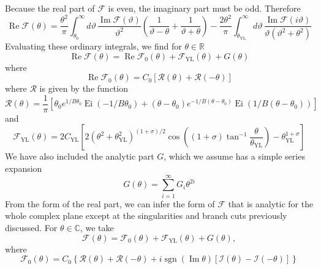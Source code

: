 \documentclass[
aps,
pre,
preprint,
longbibliography,
floatfix
]{revtex4-2}
\begin{document}
Because the real part of $\mathcal F$ is even, the imaginary part must be odd. Therefore
\begin{equation} \label{eq:dispersion}
  \operatorname{Re}\mathcal F(\theta)
  =\frac{\theta^2}{\pi}
  \int_{\theta_0}^\infty d\vartheta\,\frac{\operatorname{Im}\mathcal F(\vartheta)}{\vartheta^2}\left(\frac1{\vartheta-\theta}+\frac1{\vartheta+\theta}\right)
  -\frac{2\theta^2}\pi\int_{\theta_{\mathrm{YL}}}^{\infty}d\vartheta\,\frac{\operatorname{Im}\mathcal F(i\vartheta)}{\vartheta(\vartheta^2+\theta^2)}
\end{equation}
Evaluating these ordinary integrals, we find for $\theta\in\mathbb R$
\begin{equation}
\label{eq:FfromFoFYLG}
  \operatorname{Re}\mathcal F(\theta)=\operatorname{Re}\mathcal F_0(\theta)+\mathcal F_\mathrm{YL}(\theta)+G(\theta)
\end{equation}
where
\begin{equation} \label{eq:2d.real.Fc}
  \operatorname{Re}\mathcal F_0(\theta)
  =C_0[\mathcal R(\theta)+\mathcal R(-\theta)]
\end{equation}
where $\mathcal R$ is given by the function
\begin{equation}
  \mathcal R(\theta)
  =\frac1\pi\left[
    \theta_0e^{1/B\theta_0}\operatorname{Ei}(-1/B\theta_0)
    +(\theta-\theta_0)e^{-1/B(\theta-\theta_0)}\operatorname{Ei}(1/B(\theta-\theta_0))
  \right]
\end{equation}
and
\begin{equation}
\label{eq:FYL}
  \mathcal F_{\mathrm{YL}}(\theta)=2C_\mathrm{YL}\left[2(\theta^2+\theta_\mathrm{YL}^2)^{(1+\sigma)/2}\cos\left((1+\sigma)\tan^{-1}\frac\theta{\theta_\mathrm{YL}}\right)-\theta_\mathrm{YL}^{1+\sigma}\right]
\end{equation}
We have also included the analytic part $G$, which we assume has a simple
series expansion
\begin{equation} \label{eq:analytic.free.enery}
  G(\theta)=\sum_{i=1}^\infty G_i\theta^{2i}
\end{equation}
From the form of the real part, we can infer the form of $\mathcal F$ that is
analytic for the whole complex plane except at the singularities and branch
cuts previously discussed.
For $\theta\in\mathbb C$, we take
\begin{equation}
  \mathcal F(\theta)=\mathcal F_0(\theta)+\mathcal F_{\mathrm{YL}}(\theta)+G(\theta),
\end{equation}
where
\begin{equation}
  \mathcal F_0(\theta)=C_0\left\{
    \mathcal R(\theta)+\mathcal R(-\theta)
    +i\operatorname{sgn}(\operatorname{Im}\theta)[\mathcal I(\theta)-\mathcal I(-\theta)]
  \right\}
\end{equation}
\end{document}
